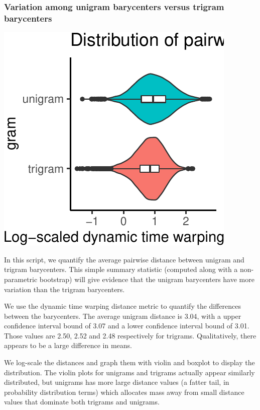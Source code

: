 \documentclass[man,floatsintext]{apa6}
\begin{document}
\hypertarget{variation-among-unigram-barycenters-versus-trigram-barycenters}{%
\subsubsection{Variation among unigram barycenters versus trigram barycenters}\label{variation-among-unigram-barycenters-versus-trigram-barycenters}}

\includegraphics{figs/plot-1.pdf}

In this script, we quantify the average pairwise distance between unigram and trigram barycenters. This simple summary statistic (computed along with a non-parametric bootstrap) will give evidence that the unigram barycenters have more variation than the trigram barycenters.

We use the dynamic time warping distance metric to quantify the differences between the barycenters. The average unigram distance is 3.04, with a upper confidence interval bound of 3.07 and a lower confidence interval bound of 3.01. Those values are 2.50, 2.52 and 2.48 respectively for trigrams. Qualitatively, there appears to be a large difference in means.

We log-scale the distances and graph them with violin and boxplot to display the distribution. The violin plots for unigrams and trigrams actually appear similarly distributed, but unigrams has more large distance values (a fatter tail, in probability distribution terms) which allocates mass away from small distance values that dominate both trigrams and unigrams.
\end{document}

